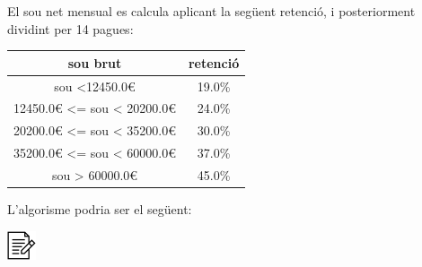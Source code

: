 \documentclass[]{book}
\begin{document}
El sou net mensual es calcula aplicant la següent retenció, i posteriorment dividint per 14 pagues:

\begin{longtable}[]{@{}cc@{}}
\toprule
sou brut & retenció\tabularnewline
\midrule
\endhead
sou \textless12450.0€ & 19.0\%\tabularnewline
12450.0€ \textless= sou \textless{} 20200.0€ & 24.0\%\tabularnewline
20200.0€ \textless= sou \textless{} 35200.0€ & 30.0\%\tabularnewline
35200.0€ \textless= sou \textless{} 60000.0€ & 37.0\%\tabularnewline
sou \textgreater{} 60000.0€ & 45.0\%\tabularnewline
\bottomrule
\end{longtable}

L'algorisme podria ser el següent:

\includegraphics{./img/alg.png}
\end{document}
